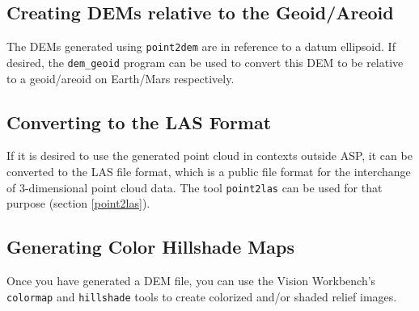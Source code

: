 %

\clearpage

\subsection{Creating DEMs relative to the Geoid/Areoid}

The DEMs generated using \texttt{point2dem} are in reference to a datum
ellipsoid. If desired, the \texttt{dem\_geoid} program can be used to
convert this DEM to be relative to a geoid/areoid on Earth/Mars
respectively.

\subsection{Converting to the LAS Format}

If it is desired to use the generated point cloud in contexts outside
ASP, it can be converted to the LAS file format, which is a public file
format for the interchange of 3-dimensional point cloud data. The tool
\texttt{point2las} can be used for that purpose (section \ref{point2las}).

\subsection{Generating Color Hillshade Maps}

Once you have generated a \ac{DEM} file, you can use the Vision Workbench's
\texttt{colormap} and \texttt{hillshade} tools to create colorized
and/or shaded relief images.

